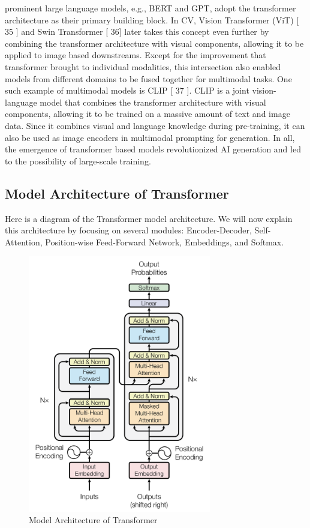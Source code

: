 \documentclass{IEEEtran}
\begin{document}
prominent large language models, e.g., BERT and GPT, adopt the transformer architecture as
their primary building block. In CV, Vision Transformer (ViT) [ 35 ] and Swin Transformer [ 36] 
later takes this concept even further by combining the transformer architecture with visual components, 
allowing it to be applied to image based downstreams. 
Except for the improvement that transformer brought
to individual modalities, this intersection also enabled models from different domains to be fused
together for multimodal tasks. One such example of multimodal models is CLIP [ 37 ]. CLIP is a
joint vision-language model that combines the transformer architecture with visual components,
allowing it to be trained on a massive amount of text and image data. Since it combines visual
and language knowledge during pre-training, it can also be used as image encoders in multimodal
prompting for generation. In all, the emergence of transformer based models revolutionized AI
generation and led to the possibility of large-scale training.

\subsection{Model Architecture of Transformer}
\par Here is a diagram of the Transformer model architecture. 
We will now explain this architecture by focusing on several modules: 
Encoder-Decoder, Self-Attention, Position-wise Feed-Forward Network, 
Embeddings, and Softmax.

\begin{figure}[htbp]
    \centerline{\includegraphics[width = 8cm]{pic/fig1.png}}
    \caption{Model Architecture of Transformer}
    \label{fig}
\end{figure}
\end{document}
